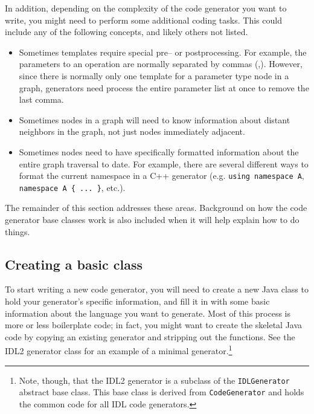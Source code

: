 In addition, depending on the complexity of the code generator you want to
write, you might need to perform some additional coding tasks. This could
include any of the following concepts, and likely others not listed.

\begin{itemize}
\item Sometimes templates require special pre-- or postprocessing. For example,
      the parameters to an operation are normally separated by commas (,).
      However, since there is normally only one template for a parameter type
      node in a graph, generators need process the entire parameter list at once
      to remove the last comma.
\item Sometimes nodes in a graph will need to know information about distant
      neighbors in the graph, not just nodes immediately adjacent.
\item Sometimes nodes need to have specifically formatted information about the
      entire graph traversal to date. For example, there are several different
      ways to format the current namespace in a C++ generator (e.g. {\tt using
      namespace A}, {\tt namespace A \{ ... \}}, etc.).
\end{itemize}

The remainder of this section addresses these areas. Background on how the code
generator base classes work is also included when it will help explain how to do
things.

\subsection{Creating a basic class}

To start writing a new code generator, you will need to create a new Java class
to hold your generator's specific information, and fill it in with some basic
information about the language you want to generate. Most of this process is
more or less boilerplate code; in fact, you might want to create the skeletal
Java code by copying an existing generator and stripping out the functions. See
the IDL2 generator class for an example of a minimal generator.\footnote{Note,
though, that the IDL2 generator is a subclass of the {\tt IDLGenerator} abstract
base class. This base class is derived from {\tt CodeGenerator} and holds the
common code for all IDL code generators.}

